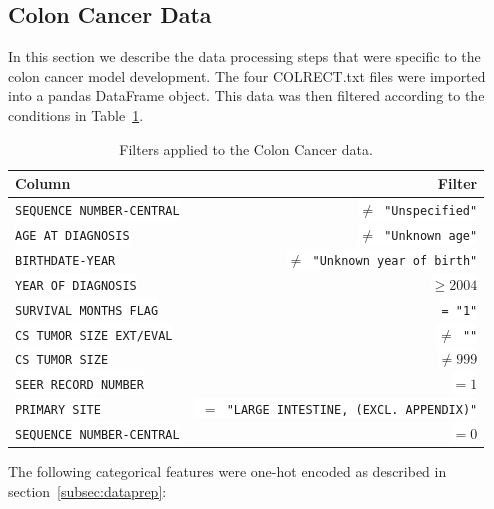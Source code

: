 \documentclass[a4paper,11pt]{article}
\newcommand{\codewhite}[1]{\colorbox{white}{\texttt{#1}}}
\begin{document}
\subsection{Colon Cancer Data}
\label{subsec:coloncancerdata}

In this section we describe the data processing steps that were specific to the colon cancer model development. The four COLRECT.txt files were imported into a pandas DataFrame object.
This data was then filtered according to the conditions in Table~\ref{tab:colonfilter}.






\begin{table}[tbp]
\begin{center}
\begin{tabular}{lr}
\toprule
 Column &  Filter \\
\midrule
\codewhite{SEQUENCE NUMBER-CENTRAL} & \codewhite{$\neq$ "Unspecified"} \\
\codewhite{AGE AT DIAGNOSIS} & \codewhite{$\neq$ "Unknown age"} \\
\codewhite{BIRTHDATE-YEAR} & \codewhite{$\neq$ "Unknown year of birth"} \\
\codewhite{YEAR OF DIAGNOSIS} & \codewhite{$\geq 2004$} \\
\codewhite{SURVIVAL MONTHS FLAG} & \codewhite{= "1"}\\
\codewhite{CS TUMOR SIZE EXT/EVAL} & \codewhite{$\neq$ ""} \\
\codewhite{CS TUMOR SIZE} & \codewhite{$\neq 999$} \\
\codewhite{SEER RECORD NUMBER} & \codewhite{$= 1$} \\
\codewhite{PRIMARY SITE} & \codewhite{ $=$ "LARGE INTESTINE, (EXCL. APPENDIX)"} \\
\codewhite{SEQUENCE NUMBER-CENTRAL} & \codewhite{$=0$} \\
\bottomrule
\end{tabular}
\caption{\label{tab:colonfilter} Filters applied to the Colon Cancer data.}
\end{center}
\end{table}






The following categorical features were one-hot encoded as described in 
section~\ref{subsec:dataprep}:
\end{document}
